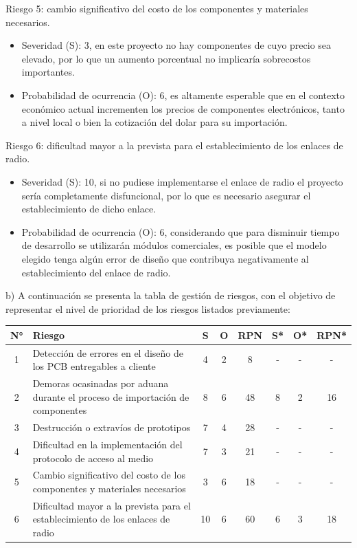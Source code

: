 \documentclass[
11pt, %
codirector, %
]{charter}
\begin{document}
Riesgo 5: cambio significativo del costo de los componentes y materiales necesarios.
\begin{itemize}
	\item Severidad (S): 3, en este proyecto no hay componentes de cuyo precio sea elevado, por lo que un aumento porcentual no implicaría sobrecostos importantes.
	\item Probabilidad de ocurrencia (O): 6, es altamente esperable que en el contexto económico actual incrementen los precios de componentes electrónicos, tanto a nivel local o bien la cotización del dolar para su importación. 
\end{itemize}

Riesgo 6: dificultad mayor a la prevista para el establecimiento de los enlaces de radio.
\begin{itemize}
	\item Severidad (S): 10, si no pudiese implementarse el enlace de radio el proyecto sería completamente disfuncional, por lo que es necesario asegurar el establecimiento de dicho enlace.
	\item Probabilidad de ocurrencia (O): 6, considerando que para disminuir tiempo de desarrollo se utilizarán módulos comerciales, es posible que el modelo elegido tenga algún error de diseño que contribuya negativamente al establecimiento del enlace de radio.
\end{itemize}


b) A continuación se presenta la tabla de gestión de riesgos, con el objetivo de representar el nivel de prioridad de los riesgos listados previamente:

\begin{table}[htpb]
\centering
\begin{tabularx}{\linewidth}{@{}|c|X|c|c|c|c|c|c|@{}}
\hline
\rowcolor[HTML]{C0C0C0} 
N° & Riesgo & S & O & RPN & S* & O* & RPN* \\ \hline
1  & Detección de errores en el diseño de los PCB entregables a cliente
& 4   & 2   & 8     & -    & -    & -      \\ \hline

2  & Demoras ocasinadas por aduana durante el proceso de importación de componentes
& 8   & 6   & 48     & 8    & 2    & 16      \\ \hline

3  & Destrucción o extravíos de prototipos
& 7   & 4   & 28     & -    & -    & -      \\ \hline

4  & Dificultad en la implementación del protocolo de acceso al medio
& 7   & 3   & 21     & -   & -   & -     \\ \hline

5  & Cambio significativo del costo de los componentes y materiales necesarios
& 3   & 6   & 18     & -    & -    & -      \\ \hline

6  & Dificultad mayor a la prevista para el establecimiento de los enlaces de radio
& 10   & 6   & 60     & 6    & 3    & 18      \\ \hline
\end{tabularx}%
\end{table}
\end{document}
